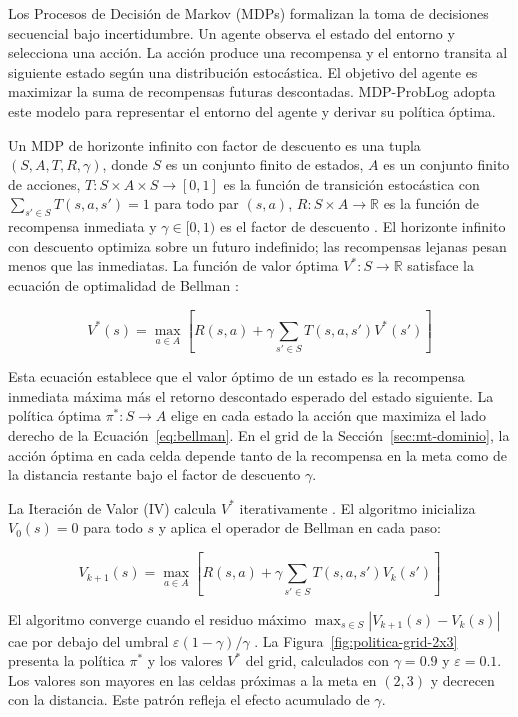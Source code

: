 Los Procesos de Decisión de Markov (MDPs) formalizan la toma de decisiones secuencial bajo incertidumbre. Un agente observa el estado del entorno y selecciona una acción. La acción produce una recompensa y el entorno transita al siguiente estado según una distribución estocástica. El objetivo del agente es maximizar la suma de recompensas futuras descontadas. MDP-ProbLog adopta este modelo para representar el entorno del agente y derivar su política óptima.

Un MDP de horizonte infinito con factor de descuento es una tupla $(S, A, T, R, \gamma)$, donde $S$ es un conjunto finito de estados, $A$ es un conjunto finito de acciones, $T : S \times A \times S \to [0,1]$ es la función de transición estocástica con $\sum_{s' \in S} T(s, a, s') = 1$ para todo par $(s, a)$, $R : S \times A \to \mathbb{R}$ es la función de recompensa inmediata y $\gamma \in [0, 1)$ es el factor de descuento \cite{puterman2014markov}. El horizonte infinito con descuento optimiza sobre un futuro indefinido; las recompensas lejanas pesan menos que las inmediatas. La función de valor óptima $V^* : S \to \mathbb{R}$ satisface la ecuación de optimalidad de Bellman \cite{bellman1957dynamic}:

\begin{equation}
  V^*(s) = \max_{a \in A} \left[ R(s, a) + \gamma \sum_{s' \in S} T(s, a, s') V^*(s') \right]
  \label{eq:bellman}
\end{equation}

Esta ecuación establece que el valor óptimo de un estado es la recompensa inmediata máxima más el retorno descontado esperado del estado siguiente. La política óptima $\pi^* : S \to A$ elige en cada estado la acción que maximiza el lado derecho de la Ecuación~\ref{eq:bellman}. En el grid de la Sección~\ref{sec:mt-dominio}, la acción óptima en cada celda depende tanto de la recompensa en la meta como de la distancia restante bajo el factor de descuento $\gamma$.

La Iteración de Valor (IV) calcula $V^*$ iterativamente \cite{puterman2014markov}. El algoritmo inicializa $V_0(s) = 0$ para todo $s$ y aplica el operador de Bellman en cada paso:

\begin{equation}
  V_{k+1}(s) = \max_{a \in A} \left[ R(s, a) + \gamma \sum_{s' \in S} T(s, a, s') V_k(s') \right]
  \label{eq:vi-backup}
\end{equation}

El algoritmo converge cuando el residuo máximo $\max_{s \in S} |V_{k+1}(s) - V_k(s)|$ cae por debajo del umbral $\varepsilon(1-\gamma)/\gamma$ \cite{puterman2014markov}. La Figura~\ref{fig:politica-grid-2x3} presenta la política $\pi^*$ y los valores $V^*$ del grid, calculados con $\gamma = 0.9$ y $\varepsilon = 0.1$. Los valores son mayores en las celdas próximas a la meta en $(2,3)$ y decrecen con la distancia. Este patrón refleja el efecto acumulado de $\gamma$.

